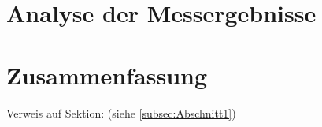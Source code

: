 \chapter{Analyse der Messergebnisse}
\label{cha:Analyse der Messergebnisse}

\chapter{Zusammenfassung}
\label{cha:Zusammenfassung}
Verweis auf Sektion: (siehe \ref{subsec:Abschnitt1})